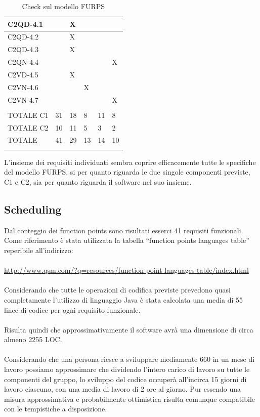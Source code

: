 \begin{longtable}{|p{}|p{}|p{}|p{}|p{}|p{}|}
 C2QD-4.1& &  X&  &  &  \\ \hline
 C2QD-4.2& &  X&  &  &  \\ \hline
 C2QD-4.3& &  X&  &  &  \\ \hline
 C2QN-4.4& &  &  &  &  X\\ \hline
 C2VD-4.5& &  X&  &  &  \\ \hline
 C2VN-4.6& &  &  X&  &  \\ \hline
 C2VN-4.7& &  &  &  &  X\\ \hline
         & &  &  &  &  \\ \hline
 TOTALE C1& 31&  18&  8&  11&  8\\ \hline
 TOTALE C2& 10&  11&  5&  3&  2\\ \hline
 TOTALE& 41&  29&  13&  14&  10\\ \hline
\caption{Check sul modello FURPS}
\end{longtable}

L'insieme dei requisiti individuati sembra coprire efficacemente tutte le
specifiche del modello FURPS, si per quanto riguarda le due singole componenti
previste, C1 e C2, sia per quanto riguarda il software nel suo insieme.

\subsection*{Scheduling}

Dal conteggio dei function points sono risultati esserci 41 requisiti
funzionali. Come riferimento \`e stata utilizzata la tabella ``function points
languages table'' reperibile all'indirizzo:
\\\\
\url{http://www.qsm.com/?q=resources/function-point-languages-table/index.html}
\\\\
Considerando che tutte le operazioni di codifica previste prevedono quasi
completamente l'utilizzo di linguaggio Java \`e stata calcolata una media di 55
linee di codice per ogni requisito funzionale.
\\\\
Risulta quindi che approssimativamente il software avr\`a una dimensione di
circa almeno 2255 LOC.
\\\\
Considerando che una persona riesce a sviluppare mediamente 660 in un mese di
lavoro possiamo approssimare che dividendo l'intero carico di lavoro su tutte le
componenti del gruppo, lo sviluppo del codice occuper\`a all'incirca
15 giorni di lavoro ciascuno, con una media di lavoro di 2 ore al giorno. Pur
essendo una misura approssimativa e probabilmente ottimistica risulta comunque
compatibile con le tempistiche a disposizione.


